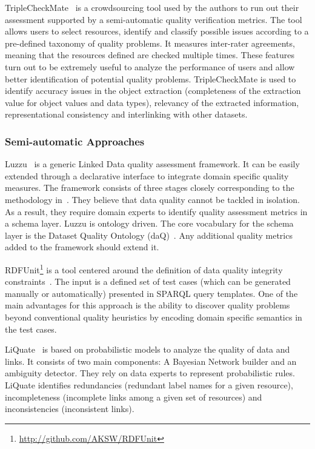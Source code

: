 TripleCheckMate~\cite{Kontokostas:KESW:13} is a crowdsourcing tool used by the authors to run out their assessment supported by a semi-automatic quality verification metrics. The tool allows users to select resources, identify and classify possible issues according to a pre-defined taxonomy of quality problems. It measures inter-rater agreements, meaning that the resources defined are checked multiple times. These features turn out to be extremely useful to analyze the performance of users and allow better identification of potential quality problems. TripleCheckMate is used to identify accuracy issues in the object extraction (completeness of the extraction value for object values and data types), relevancy of the extracted information, representational consistency and interlinking with other datasets.

\subsubsection{Semi-automatic Approaches}
Luzzu~\cite{Debattista:CoRR:14} is a generic Linked Data quality assessment framework. It can be easily extended through a declarative interface to integrate domain specific quality measures. The framework consists of three stages closely corresponding to the methodology in~\cite{Anisa:LDQ:14}. They believe that data quality cannot be tackled in isolation. As a result, they require domain experts to identify quality assessment metrics in a schema layer. Luzzu is ontology driven. The core vocabulary for the schema layer is the Dataset Quality Ontology (daQ)~\cite{Debattista:WWW:14}. Any additional quality metrics added to the framework should extend it.

RDFUnit\footnote{\url{http://github.com/AKSW/RDFUnit}} is a tool centered around the definition of data quality integrity constraints~\cite{Kontokostas:WWW:14}. The input is a defined set of test cases (which can be generated manually or automatically) presented in SPARQL query templates. One of the main advantages for this approach is the ability to discover quality problems beyond conventional quality heuristics by encoding domain specific semantics in the test cases.

LiQuate~\cite{Ruckhaus:ESWC:14} is based on probabilistic models to analyze the quality of data and links. It consists of two main components: A Bayesian Network builder and an ambiguity detector. They rely on data experts to represent probabilistic rules. LiQuate identifies redundancies (redundant label names for a given resource), incompleteness (incomplete links among a given set of resources) and inconsistencies (inconsistent links).

